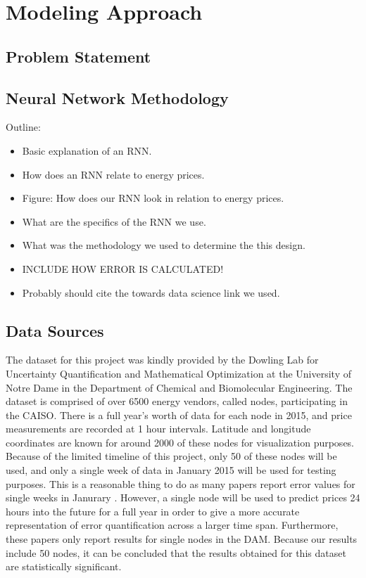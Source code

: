 \documentclass[sigconf]{acmart}
\begin{document}

\section{Modeling Approach}
\label{sec:approach}

\subsection{Problem Statement}

\subsection{Neural Network Methodology}

Outline:
\begin{itemize}
	\item Basic explanation of an RNN.
	\item How does an RNN relate to energy prices.
	\item Figure: How does our RNN look in relation to energy prices.
	\item What are the specifics of the RNN we use.
	\item What was the methodology we used to determine the this design.
	\item INCLUDE HOW ERROR IS CALCULATED!
	\item Probably should cite the towards data science link we used.
\end{itemize}

\subsection{Data Sources}
The dataset for this project was kindly provided by the Dowling Lab for Uncertainty Quantification and Mathematical Optimization at the University of Notre Dame in the Department of Chemical and Biomolecular Engineering. The dataset is comprised of over 6500 energy vendors, called nodes, participating in the CAISO. There is a full year's worth of data for each node in 2015, and price measurements are recorded at 1 hour intervals. Latitude and longitude coordinates are known for around 2000 of these nodes for visualization purposes. Because of the limited timeline of this project, only 50 of these nodes will be used, and only a single week of data in January 2015 will be used for testing purposes.  This is a reasonable thing to do as many papers report error values for single weeks in Janurary \cite{Conejo2005a,Garcia2005,Tan2010}. However, a single node will be used to predict prices 24 hours into the future for a full year in order to give a more accurate representation of error quantification across a larger time span. Furthermore, these papers only report results for single nodes in the DAM. Because our results include 50 nodes, it can be concluded that the results obtained for this dataset are statistically significant. 
\end{document}

